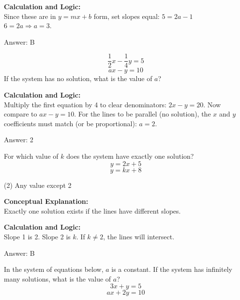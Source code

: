 \documentclass[11pt,paper=a4,answers]{exam}
\begin{document}
\begin{questions}
\begin{solution}
\textbf{Calculation and Logic:} \\
Since these are in $y=mx+b$ form, set slopes equal:
$5 = 2a - 1$ \\
$6 = 2a \Rightarrow a = 3$.

\vspace{15pt}
Answer: \colorbox{yellow!100}{B}
\end{solution}

\question
\[ \frac{1}{2}x - \frac{1}{4}y = 5 \]
\[ ax - y = 10 \]
If the system has no solution, what is the value of $a$?

\begin{solution}
\textbf{Calculation and Logic:} \\
Multiply the first equation by 4 to clear denominators: $2x - y = 20$.
Now compare to $ax - y = 10$.
For the lines to be parallel (no solution), the $x$ and $y$ coefficients must match (or be proportional): $a = 2$.

\vspace{15pt}
Answer: \colorbox{yellow!100}{2}
\end{solution}


\question
For which value of $k$ does the system have exactly one solution?
\[ y = 2x + 5 \]
\[ y = kx + 8 \]
\begin{tasks}(2)
    \task Any value except 2
\end{tasks}

\begin{solution}
\textbf{Conceptual Explanation:} \\
Exactly one solution exists if the lines have different slopes.

\vspace{10pt}
\textbf{Calculation and Logic:} \\
Slope 1 is 2. Slope 2 is $k$.
If $k \neq 2$, the lines will intersect.

\vspace{15pt}
Answer: \colorbox{yellow!100}{B}
\end{solution}

\question
In the system of equations below, $a$ is a constant. If the system has infinitely many solutions, what is the value of $a$?
\[ 3x + y = 5 \]
\[ ax + 2y = 10 \]


\end{questions}
\end{document}
